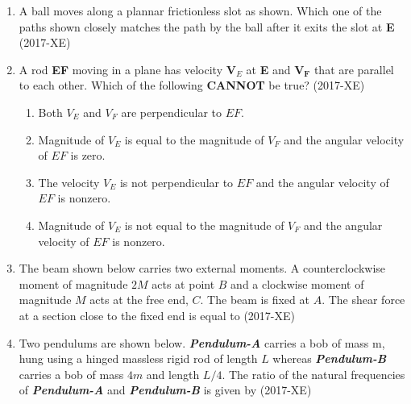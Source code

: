 \documentclass[journal]{IEEEtran}
\begin{document}
\begin{enumerate}

\item A ball moves along a plannar frictionless slot as shown. Which one of the paths shown closely matches the path by the ball after it exits the slot at \textbf{E} \hfill(2017-XE)
\begin{enumerate}
\end{enumerate}

\item A rod \textbf{EF} moving in a plane has velocity $\textbf{V}_E$ at \textbf{E} and $\textbf{V}_\textbf{F}$ that are parallel to each other. Which of the following \textbf{CANNOT} be true? \hfill(2017-XE)

\begin{enumerate}
    \item Both $V_E$ and $V_F$ are perpendicular to $EF$.
    \item Magnitude of $V_E$ is equal to the magnitude of $V_F$ and the angular velocity of $EF$ is zero.
    \item The velocity $V_E$ is not perpendicular to $EF$ and the angular velocity of $EF$ is nonzero.
    \item Magnitude of $V_E$ is not equal to the magnitude of $V_F$ and the angular velocity of $EF$ is nonzero.
\end{enumerate}
\item The beam shown below carries two external moments. A counterclockwise moment of magnitude $2M$ acts at point $B$ and a clockwise moment of magnitude $M$ acts at the free end, $C$. The beam is fixed at $A$. The shear force at a section close to the fixed end is equal to \hfill(2017-XE)

\begin{enumerate}
\end{enumerate}
\item Two pendulums are shown below. \textbf{\textit{Pendulum-A}} carries a bob of mass m, hung using a hinged massless rigid rod of length $L$ whereas \textbf{\textit{Pendulum-B}} carries a bob of mass $4m$ and length $L/4$. The ratio of the natural frequencies of \textbf{\textit{Pendulum-A}} and \textbf{\textit{Pendulum-B}} is given by \hfill(2017-XE)

\end{enumerate}
\end{document}
